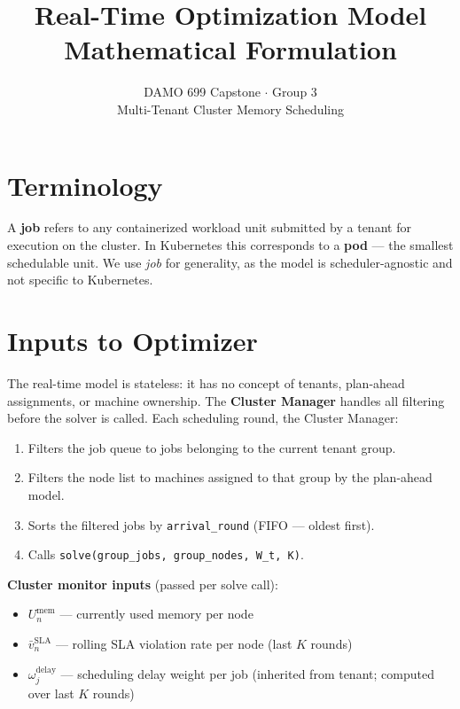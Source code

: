 \documentclass[11pt]{article}
\title{\textbf{Real-Time Optimization Model}\\[0.5em]
       \large Mathematical Formulation}
\author{DAMO 699 Capstone $\cdot$ Group 3\\
        Multi-Tenant Cluster Memory Scheduling}
\date{}
\newcommand{\vbarsla}{\bar{v}_n^{\text{SLA}}}
\newcommand{\Umem}{U_n^{\text{mem}}}
\newcommand{\omdelay}{\omega_j^{\text{delay}}}
\begin{document}
\maketitle
\tableofcontents
\newpage

\section*{Terminology}

A \textbf{job} refers to any containerized workload unit submitted by a tenant
for execution on the cluster. In Kubernetes this corresponds to a \textbf{pod}
--- the smallest schedulable unit. We use \emph{job} for generality, as the
model is scheduler-agnostic and not specific to Kubernetes.

\section{Inputs to Optimizer}

The real-time model is stateless: it has no concept of tenants, plan-ahead
assignments, or machine ownership. The \textbf{Cluster Manager} handles all
filtering before the solver is called. Each scheduling round, the Cluster Manager:
\begin{enumerate}[noitemsep, topsep=2pt]
  \item Filters the job queue to jobs belonging to the current tenant group.
  \item Filters the node list to machines assigned to that group by the plan-ahead model.
  \item Sorts the filtered jobs by \texttt{arrival\_round} (FIFO --- oldest first).
  \item Calls \texttt{solve(group\_jobs, group\_nodes, W\_t, K)}.
\end{enumerate}

\medskip
\noindent\textbf{Cluster monitor inputs} (passed per solve call):
\begin{itemize}[noitemsep, topsep=2pt]
  \item $\Umem$ --- currently used memory per node
  \item $\vbarsla$ --- rolling SLA violation rate per node (last $K$ rounds)
  \item $\omdelay$ --- scheduling delay weight per job (inherited from tenant;
    computed over last $K$ rounds)
\end{itemize}
\end{document}
